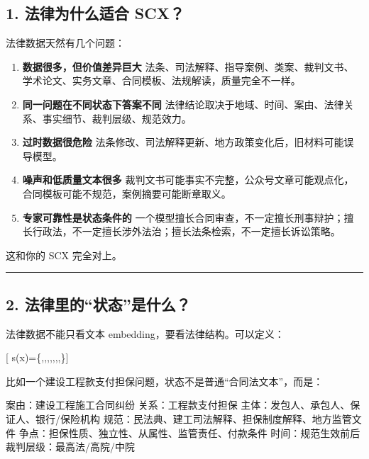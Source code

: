 \documentclass[
  12pt,
]{ctexart}
\newenvironment{Shaded}{}{}
\newcommand{\NormalTok}[1]{#1}
\begin{document}
\subsection{1. 法律为什么适合
SCX？}\label{ux6cd5ux5f8bux4e3aux4ec0ux4e48ux9002ux5408-scx}

法律数据天然有几个问题：

\begin{enumerate}
\def\labelenumi{\arabic{enumi}.}
\item
  \textbf{数据很多，但价值差异巨大}
  法条、司法解释、指导案例、类案、裁判文书、学术论文、实务文章、合同模板、法规解读，质量完全不一样。
\item
  \textbf{同一问题在不同状态下答案不同}
  法律结论取决于地域、时间、案由、法律关系、事实细节、裁判层级、规范效力。
\item
  \textbf{过时数据很危险}
  法条修改、司法解释更新、地方政策变化后，旧材料可能误导模型。
\item
  \textbf{噪声和低质量文本很多}
  裁判文书可能事实不完整，公众号文章可能观点化，合同模板可能不规范，案例摘要可能断章取义。
\item
  \textbf{专家可靠性是状态条件的}
  一个模型擅长合同审查，不一定擅长刑事辩护；擅长行政法，不一定擅长涉外法治；擅长法条检索，不一定擅长诉讼策略。
\end{enumerate}

这和你的 SCX 完全对上。

\begin{center}\rule{0.5\linewidth}{0.5pt}\end{center}

\subsection{2.
法律里的``状态''是什么？}\label{ux6cd5ux5f8bux91ccux7684ux72b6ux6001ux662fux4ec0ux4e48}

法律数据不能只看文本 embedding，要看法律结构。可以定义：

{[}
s(x)=\{,,,,,,,\}{]}

比如一个建设工程款支付担保问题，状态不是普通``合同法文本''，而是：

\begin{Shaded}
\begin{Highlighting}[]
\NormalTok{案由：建设工程施工合同纠纷}
\NormalTok{关系：工程款支付担保}
\NormalTok{主体：发包人、承包人、保证人、银行/保险机构}
\NormalTok{规范：民法典、建工司法解释、担保制度解释、地方监管文件}
\NormalTok{争点：担保性质、独立性、从属性、监管责任、付款条件}
\NormalTok{时间：规范生效前后}
\NormalTok{裁判层级：最高法/高院/中院}
\end{Highlighting}
\end{Shaded}
\end{document}
